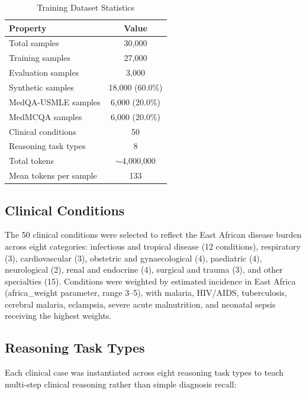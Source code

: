 \documentclass[journal]{IEEEtran}
\begin{document}
\begin{table}[h!]
\centering
\caption{Training Dataset Statistics}
\label{tab:dataset}
\begin{tabular}{lc}
\toprule
\textbf{Property} & \textbf{Value} \\
\midrule
Total samples            & 30{,}000 \\
Training samples         & 27{,}000 \\
Evaluation samples       & 3{,}000 \\
Synthetic samples        & 18{,}000 (60.0\%) \\
MedQA-USMLE samples      & 6{,}000 (20.0\%) \\
MedMCQA samples          & 6{,}000 (20.0\%) \\
Clinical conditions      & 50 \\
Reasoning task types     & 8 \\
Total tokens             & $\sim$4{,}000{,}000 \\
Mean tokens per sample   & 133 \\
\bottomrule
\end{tabular}
\end{table}

\subsection{Clinical Conditions}

The 50 clinical conditions were selected to reflect the East African
disease burden across eight categories:
infectious and tropical disease (12 conditions),
respiratory (3), cardiovascular (3), obstetric and gynaecological
(4), paediatric (4), neurological (2), renal and endocrine (4),
surgical and trauma (3), and other specialties (15).
Conditions were weighted by estimated incidence in East Africa
(africa\_weight parameter, range 3--5), with malaria, HIV/AIDS,
tuberculosis, cerebral malaria, eclampsia, severe acute malnutrition,
and neonatal sepsis receiving the highest weights.

\subsection{Reasoning Task Types}

Each clinical case was instantiated across eight reasoning task
types to teach multi-step clinical reasoning rather than simple
diagnosis recall:
\end{document}

